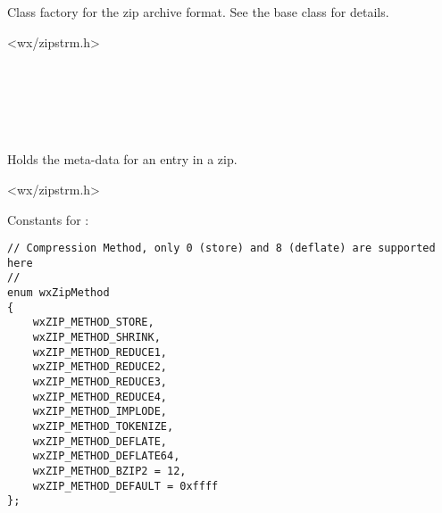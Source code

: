 %
%

\section{}\label{wxzipclassfactory}

Class factory for the zip archive format. See the base class
for details.




<wx/zipstrm.h>


\\
\\
\\


%
%

\section{}\label{wxzipentry}

Holds the meta-data for an entry in a zip.




<wx/zipstrm.h>


Constants for :

\begin{verbatim}
// Compression Method, only 0 (store) and 8 (deflate) are supported here
//
enum wxZipMethod
{
    wxZIP_METHOD_STORE,
    wxZIP_METHOD_SHRINK,
    wxZIP_METHOD_REDUCE1,
    wxZIP_METHOD_REDUCE2,
    wxZIP_METHOD_REDUCE3,
    wxZIP_METHOD_REDUCE4,
    wxZIP_METHOD_IMPLODE,
    wxZIP_METHOD_TOKENIZE,
    wxZIP_METHOD_DEFLATE,
    wxZIP_METHOD_DEFLATE64,
    wxZIP_METHOD_BZIP2 = 12,
    wxZIP_METHOD_DEFAULT = 0xffff
};

\end{verbatim}

